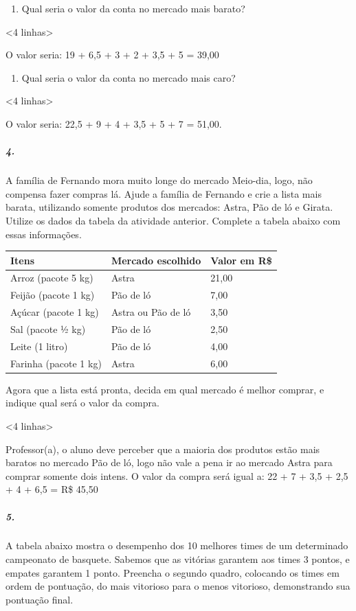 \begin{enumerate}
\def\labelenumi{\alph{enumi})}
\item
  Qual seria o valor da conta no mercado mais barato?
\end{enumerate}

\textless{}4 linhas\textgreater{}

O valor seria: 19 + 6,5 + 3 + 2 + 3,5 + 5 = 39,00

\begin{enumerate}
\def\labelenumi{\alph{enumi})}
\item
  Qual seria o valor da conta no mercado mais caro?
\end{enumerate}

\textless{}4 linhas\textgreater{}

O valor seria: 22,5 + 9 + 4 + 3,5 + 5 + 7 = 51,00.

\subparagraph{4.}\label{section-81}

A família de Fernando mora muito longe do mercado Meio-dia, logo, não
compensa fazer compras lá. Ajude a família de Fernando e crie a lista
mais barata, utilizando somente produtos dos mercados: Astra, Pão de ló
e Girata. Utilize os dados da tabela da atividade anterior. Complete a
tabela abaixo com essas informações.

\begin{longtable}[]{@{}lll@{}}
\toprule
Itens & Mercado escolhido & Valor em R\$\tabularnewline
\midrule
\endhead
Arroz (pacote 5 kg) & Astra & 21,00\tabularnewline
Feijão (pacote 1 kg) & Pão de ló & 7,00\tabularnewline
Açúcar (pacote 1 kg) & Astra ou Pão de ló & 3,50\tabularnewline
Sal (pacote ½ kg) & Pão de ló & 2,50\tabularnewline
Leite (1 litro) & Pão de ló & 4,00\tabularnewline
Farinha (pacote 1 kg) & Astra & 6,00\tabularnewline
\bottomrule
\end{longtable}

Agora que a lista está pronta, decida em qual mercado é melhor comprar,
e indique qual será o valor da compra.

\textless{}4 linhas\textgreater{}

Professor(a), o aluno deve perceber que a maioria dos produtos estão
mais baratos no mercado Pão de ló, logo não vale a pena ir ao mercado
Astra para comprar somente dois intens. O valor da compra será igual a:
22 + 7 + 3,5 + 2,5 + 4 + 6,5 = R\$ 45,50

\subparagraph{5.}\label{section-82}

A tabela abaixo mostra o desempenho dos 10 melhores times de um
determinado campeonato de basquete. Sabemos que as vitórias garantem aos
times 3 pontos, e empates garantem 1 ponto. Preencha o segundo quadro,
colocando os times em ordem de pontuação, do mais vitorioso para o menos
vitorioso, demonstrando sua pontuação final.

